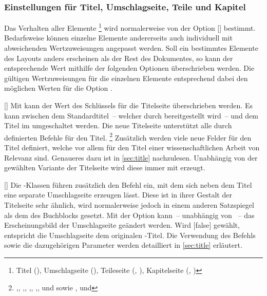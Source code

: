 \subsubsection{Einstellungen für Titel, Umschlagseite, Teile und Kapitel}
Das Verhalten aller Elemente%
\footnote{%
  Titel (), Umschlagseite (),
  Teileseite (, ),
  Kapitelseite (, )%
}
wird normalerweise von der Option [\PSet] bestimmt. Bedarfsweise 
können einzelne Elemente andererseits auch individuell mit abweichenden 
Wertzuweisungen angepasst werden. Soll ein bestimmtes Elemente des Layouts 
anders erscheinen als der Rest des Dokumentes, so kann der entsprechende Wert 
mithilfe der folgenden Optionen überschrieben werden. Die gültigen 
Wertzuweisungen für die einzelnen Elemente entsprechend dabei den möglichen 
Werten für die Option .

\begin{Declaration}{[\PSet]}
\printdeclarationlist%
%
%
Mit  kann der Wert des Schlüssels  für die 
Titelseite überschrieben werden. Es kann zwischen dem Standardtitel~-- welcher 
durch \KOMAScript{} bereitgestellt wird~-- und dem Titel im \CD umgeschaltet 
werden. Die neue Titelseite unterstützt alle durch \KOMAScript{} definierten 
Befehle für den Titel.%
\footnote{\raggedright%
  ,,
  ,,
  ,,
  ,,
   und  sowie
  ,
  und 
}
Zusätzlich werden viele neue Felder für den Titel definiert, welche vor allem 
für den Titel einer wissenschaftlichen Arbeit von Relevanz sind. Genaueres dazu 
ist in \autoref{sec:title} nachzulesen. Unabhängig von der gewählten Variante 
der Titelseite wird diese immer mit  erzeugt.
\end{Declaration}

\begin{Declaration}[v2.02]{[\PSet]}
\printdeclarationlist%
%
%
%
Die \TUDScript-Klassen führen zusätzlich den Befehl  ein, mit 
dem sich neben dem Titel eine separate Umschlagseite erzeugen lässt. Diese ist 
in ihrer Gestalt der Titelseite sehr ähnlich, wird normalerweise jedoch in 
einem anderen Satzspiegel als dem des Buchblocks gesetzt. Mit der Option 
 kann~-- unabhängig von ~-- das Erscheinungsbild 
der Umschlagseite geändert werden. Wird [false] gewählt, 
entspricht die Umschlagseite dem originalen \KOMAScript-Titel. Die Verwendung 
des Befehls  sowie die dazugehörigen Parameter werden 
detailliert in \autoref{sec:title} erläutert.
\end{Declaration}

